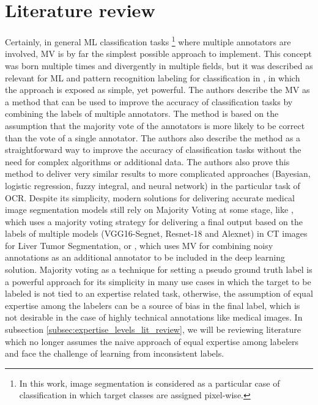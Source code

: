 \section{Literature review}\label{sec:state_of_art}

Certainly, in general \gls{ML} classification tasks \footnote{In this
  work, image segmentation is considered as a particular case of classification
in which target classes are assigned pixel-wise.} where multiple
annotators are involved, \gls{MV} is by far the simplest
possible approach to implement. This concept was born multiple times
and divergently in multiple fields, but it was described as relevant
for \gls{ML} and pattern recognition labeling for classification in
\cite{LamAndSuen1997}, in which the approach is exposed as simple,
yet powerful. The authors describe the \gls{MV} as a method that can
be used to improve the accuracy of classification tasks by combining
the labels of multiple annotators. The method is based on the
assumption that the majority vote of the annotators is more likely to
be correct than the vote of a single annotator. The authors also
describe the method as a straightforward way to improve the accuracy
of classification tasks without the need for complex algorithms or
additional data. The authors also prove this method to deliver very
similar results to more complicated approaches (Bayesian, logistic
regression, fuzzy integral, and neural network) in the
particular task of \gls{OCR}. Despite its simplicity, modern
solutions for delivering accurate medical image segmentation models
still rely on Majority Voting at some stage, like \cite{Elnakib2020},
which uses a majority voting strategy for delivering a final output
based on the labels of multiple models (VGG16-Segnet, Resnet-18 and
Alexnet) in \gls{CT} images for Liver Tumor Segmentation, or
\cite{Lopez2023}, which uses \gls{MV} for combining noisy annotations
as an additional annotator to be included in the deep learning solution.
Majority voting as a technique for setting a pseudo ground truth label
is a powerful approach for its simplicity in many use cases in which
the target to be labeled is not tied to an expertise related task,
otherwise, the assumption of equal expertise among the labelers can
be a source of bias in the final label, which is not desirable in the
case of highly technical annotations like medical images.
In subsection \ref{subsec:expertise_levels_lit_review}, we will be
reviewing literature which no longer assumes the naive approach of
equal expertise among labelers and face the challenge of learning
from inconsistent labels.

